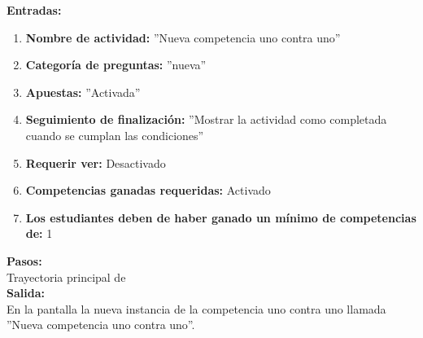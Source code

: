     \textbf{Entradas:}\\
    \begin{enumerate}
        \item \textbf{Nombre de actividad:} ''Nueva competencia uno contra uno''
        \item \textbf{Categoría de preguntas:} ''nueva''
        \item \textbf{Apuestas:} ''Activada''
        \item \textbf{Seguimiento de finalización:} ''Mostrar la actividad como completada cuando se cumplan las condiciones''
        \item \textbf{Requerir ver:} Desactivado
        \item \textbf{Competencias ganadas requeridas:} Activado
        \item \textbf{Los estudiantes deben de haber ganado un mínimo de competencias de:} 1
    \end{enumerate}
    \textbf{Pasos:}\\

    Trayectoria principal de \\

    \textbf{Salida:}\\

     En la pantalla  la nueva instancia de la competencia uno contra uno llamada ''Nueva competencia uno contra uno''.
